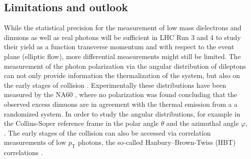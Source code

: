 \documentclass[../report.tex]{subfiles}
\providecommand{\main}{..}
\begin{document}


\subsection{Limitations and outlook}

While the statistical precision for the measurement of low mass dielectrons and dimuons as well as real photons will be sufficient in LHC Run 3 and 4 to study their yield as a function transverse momentum and with respect to the event plane (elliptic flow), more differential measurements might still be limited. 
The measurement of the photon polarization via the angular distribution of dileptons can not only provide information the thermalization of the system, but also on the early stages of collision \cite{BaymEtAl}. Experimentally these distributions have been measured by the NA60 \cite{PRL 102, 222301 (2009)}, where no polarization was found concluding that the observed excess dimuons are in agreement with the thermal emission from a a randomized system. In order to study the angular distributions, for example in the Collins-Soper reference frame \cite{CS} in the polar angle $\theta$ and the azimuthal angle $\varphi$, .
The early stages of the collision can also be accessed via correlation measurements of low $p_{\mathrm{T}}$ photons, the so-called Hanbury--Brown-Twiss (HBT) correlations \cite{TODO}.  
\end{document}
